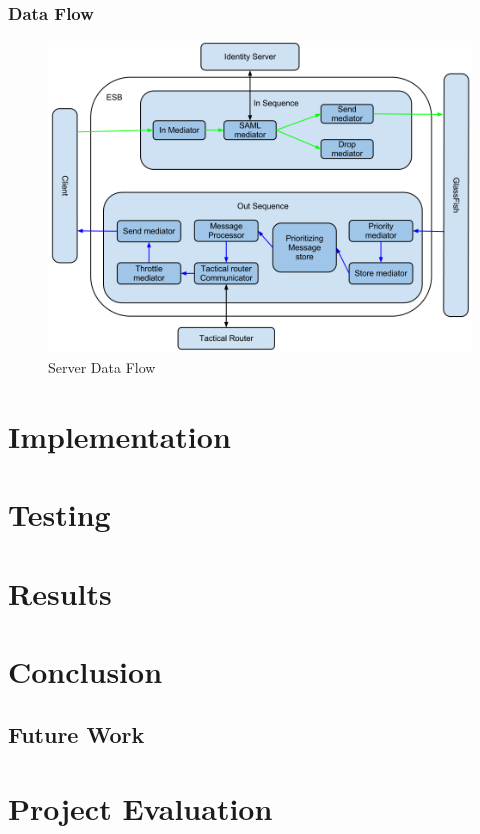\documentclass[12pt]{article}
\begin{document}
        \subsubsection{Data Flow}\label{serverdataflow}
            \begin{figure}[htb]
                \centering
                \includegraphics[scale=0.4]{DataFlowDiagramServer}
                \caption{Server Data Flow}
                \label{fig:serverDataFlow}
            \end{figure}
        
    
\section{Implementation}\label{implementation}
\section{Testing}\label{teting}
\section{Results}\label{results}
\section{Conclusion}\label{conclusion}
    \subsection{Future Work}\label{future}
\section{Project Evaluation}\label{evaluation}
\end{document}
